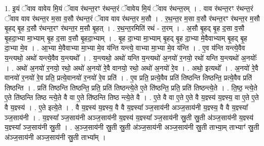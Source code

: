 \documentclass[17pt]{extarticle}
\begin{document}
1. इ॒यं ॅवाव वावेय मि॒यं ॅवाव र॑थन्त॒रꣳ र॑थन्त॒रं ॅवावेय मि॒यं ॅवाव र॑थन्त॒रम् । . वाव र॑थन्त॒रꣳ र॑थन्त॒रं ॅवाव वाव र॑थन्त॒र म॒सा व॒सौ र॑थन्त॒रं ॅवाव वाव र॑थन्त॒र म॒सौ । . र॒थ॒न्त॒र म॒सा व॒सौ र॑थन्त॒रꣳ र॑थन्त॒र म॒सौ बृ॒हद् बृ॒ह द॒सौ र॑थन्त॒रꣳ र॑थन्त॒र म॒सौ बृ॒हत् । . र॒थ॒न्त॒रमिति॑ रथं - त॒रम् । . अ॒सौ बृ॒हद् बृ॒ह द॒सा व॒सौ बृ॒हदा॒भ्या मा॒भ्याम् बृ॒ह द॒सा व॒सौ बृ॒हदा॒भ्याम् । . बृ॒ह दा॒भ्या मा॒भ्याम् बृ॒हद् बृ॒ह दा॒भ्या मे॒वैवाभ्याम् बृ॒हद् बृ॒ह दा॒भ्या मे॒व । . आ॒भ्या मे॒वैवाभ्या मा॒भ्या मे॒व य॑न्ति यन्त्ये॒ वाभ्या मा॒भ्या मे॒व य॑न्ति । . ए॒व य॑न्ति यन्त्ये॒वैव य॒न्त्यथो॒ अथो॑ यन्त्ये॒वैव य॒न्त्यथो᳚ । . य॒न्त्यथो॒ अथो॑ यन्ति य॒न्त्यथो॑ अ॒नयो॑ र॒नयो॒ रथो॑ यन्ति य॒न्त्यथो॑ अ॒नयोः᳚ । . अथो॑ अ॒नयो॑ र॒नयो॒ रथो॒ अथो॑ अ॒नयो॑ रे॒वै वानयो॒ रथो॒ अथो॑ अ॒नयो॑ रे॒व । . अथो॒ इत्यथो᳚ । . अ॒नयो॑ रे॒वै वानयो॑ र॒नयो॑ रे॒व प्रति॒ प्रत्ये॒वानयो॑ र॒नयो॑ रे॒व प्रति॑ । . ए॒व प्रति॒ प्रत्ये॒वैव प्रति॑ तिष्ठन्ति तिष्ठन्ति॒ प्रत्ये॒वैव प्रति॑ तिष्ठन्ति । . प्रति॑ तिष्ठन्ति तिष्ठन्ति॒ प्रति॒ प्रति॑ तिष्ठन्त्ये॒ते ए॒ते ति॑ष्ठन्ति॒ प्रति॒ प्रति॑ तिष्ठन्त्ये॒ते । . ति॒ष्ठ॒ न्त्ये॒ते ए॒ते ति॑ष्ठन्ति तिष्ठ न्त्ये॒ते वै वा ए॒ते ति॑ष्ठन्ति तिष्ठ न्त्ये॒ते वै । . ए॒ते वै वा ए॒ते ए॒ते वै य॒ज्ञ्स्य॑ य॒ज्ञ्स्य॒ वा ए॒ते ए॒ते वै य॒ज्ञ्स्य॑ । . ए॒ते इत्ये॒ते । . वै य॒ज्ञ्स्य॑ य॒ज्ञ्स्य॒ वै वै य॒ज्ञ्स्या᳚ ञ्ज॒साय॑नी अञ्ज॒साय॑नी य॒ज्ञ्स्य॒ वै वै य॒ज्ञ्स्या᳚ ञ्ज॒साय॑नी । . य॒ज्ञ्स्या᳚ ञ्ज॒साय॑नी अञ्ज॒साय॑नी य॒ज्ञ्स्य॑ य॒ज्ञ्स्या᳚ ञ्ज॒साय॑नी स्रु॒ती स्रु॒ती अ॑ञ्ज॒साय॑नी य॒ज्ञ्स्य॑ य॒ज्ञ्स्या᳚ ञ्ज॒साय॑नी स्रु॒ती । . अ॒ञ्ज॒साय॑नी स्रु॒ती स्रु॒ती अ॑ञ्ज॒साय॑नी अञ्ज॒साय॑नी स्रु॒ती ताभ्या॒म् ताभ्याꣳ॑ स्रु॒ती अ॑ञ्ज॒साय॑नी अञ्ज॒साय॑नी स्रु॒ती ताभ्या᳚म् । \newline
\end{document}

